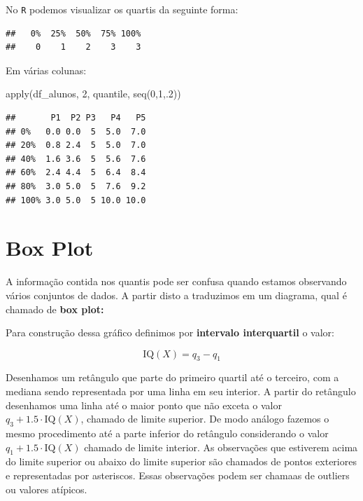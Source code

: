 \documentclass[
]{book}
\newenvironment{Shaded}{\begin{snugshade}}{\end{snugshade}}
\newcommand{\DecValTok}[1]{\textcolor[rgb]{0.00,0.00,0.81}{#1}}
\newcommand{\FunctionTok}[1]{\textcolor[rgb]{0.00,0.00,0.00}{#1}}
\newcommand{\NormalTok}[1]{#1}
\newcommand{\SpecialCharTok}[1]{\textcolor[rgb]{0.00,0.00,0.00}{#1}}
\begin{document}
No \texttt{R} podemos visualizar os quartis da seguinte forma:

\begin{Shaded}
\end{Shaded}

\begin{verbatim}
##   0%  25%  50%  75% 100% 
##    0    1    2    3    3
\end{verbatim}

Em várias colunas:

\begin{Shaded}
\begin{Highlighting}[]
\FunctionTok{apply}\NormalTok{(df\_alunos, }\DecValTok{2}\NormalTok{, quantile, }\FunctionTok{seq}\NormalTok{(}\DecValTok{0}\NormalTok{,}\DecValTok{1}\NormalTok{,.}\DecValTok{2}\NormalTok{))}
\end{Highlighting}
\end{Shaded}

\begin{verbatim}
##       P1  P2 P3   P4   P5
## 0%   0.0 0.0  5  5.0  7.0
## 20%  0.8 2.4  5  5.0  7.0
## 40%  1.6 3.6  5  5.6  7.6
## 60%  2.4 4.4  5  6.4  8.4
## 80%  3.0 5.0  5  7.6  9.2
## 100% 3.0 5.0  5 10.0 10.0
\end{verbatim}

\hypertarget{box-plot}{%
\section{Box Plot}\label{box-plot}}

A informação contida nos quantis pode ser confusa quando estamos observando vários conjuntos de dados. A partir disto a traduzimos em um diagrama, qual é chamado de \textbf{box plot:}

Para construção dessa gráfico definimos por \textbf{intervalo interquartil} o valor:

\[
\text{IQ}(X) = q_3 - q_1
\]

Desenhamos um retângulo que parte do primeiro quartil até o terceiro, com a mediana sendo representada por uma linha em seu interior. A partir do retângulo desenhamos uma linha até o maior ponto que não exceta o valor \(q_3+1.5 \cdot \text{IQ}(X)\), chamado de limite superior. De modo análogo fazemos o mesmo procedimento até a parte inferior do retângulo considerando o valor \(q_1 + 1.5 \cdot \text{IQ}(X)\) chamado de limite interior. As observações que estiverem acima do limite superior ou abaixo do limite superior são chamados de pontos exteriores e representadas por asteriscos. Essas observações podem ser chamaas de outliers ou valores atípicos.
\end{document}
